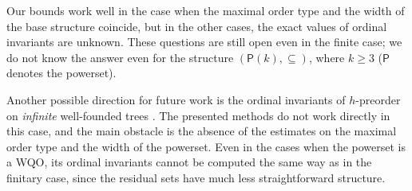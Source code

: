 \documentclass[runningheads]{llncs}
\let \geq \geqslant
\begin{document}
Our bounds work well in the case when the maximal order type and the width of the base structure coincide, but in the other cases, the exact values of ordinal invariants are unknown. These questions are still open even in the finite case; we do not know the answer even for the structure $(\mathsf{P}(k), \subseteq)$, where $k \geq 3$ ($\mathsf{P}$ denotes the powerset).

Another possible direction for future work is the ordinal invariants of $h$-preorder on \textit{infinite} well-founded trees \cite{Selivanov2007}. The presented methods do not work directly in this case, and the main obstacle is the absence of the estimates on the maximal order type and the width of the powerset. Even in the cases when the powerset is a WQO, its ordinal invariants cannot be computed the same way as in the finitary case, since the residual sets have much less straightforward structure.



\end{document}
